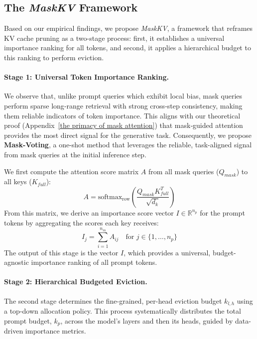 \subsection{The \emph{MaskKV} Framework}
\label{sec: method}
Based on our empirical findings, we propose \emph{MaskKV}, a framework that reframes KV cache pruning as a two-stage process: first, it establishes a universal importance ranking for all tokens, and second, it applies a hierarchical budget to this ranking to perform eviction.

\paragraph{Stage 1: Universal Token Importance Ranking.}

We observe that, unlike prompt queries which exhibit local bias, mask queries perform sparse long‑range retrieval with strong cross‑step consistency, making them reliable indicators of token importance. This aligns with our theoretical proof (Appendix~\ref{the primacy of mask attention}) that mask‑guided attention provides the most direct signal for the generative task.
Consequently, we propose \textbf{Mask-Voting}, a one-shot method that leverages the reliable, task-aligned signal from mask queries at the initial inference step.

We first compute the attention score matrix $A$ from all mask queries ($Q_{mask}$) to all keys ($K_{full}$):
\begin{equation}
    A = \text{softmax}_{\text{row}}\left(\frac{Q_{mask} K_{full}^T}{\sqrt{d_k}}\right)
\end{equation}
From this matrix, we derive an importance score vector $I \in \mathbb{R}^{n_p}$ for the prompt tokens by aggregating the scores each key receives:
\begin{equation}
    I_j = \sum_{i=1}^{n_m} A_{ij} \quad \text{for } j \in \{1, \dots, n_p\}
\end{equation}
The output of this stage is the vector $I$, which provides a universal, budget-agnostic importance ranking of all prompt tokens.

\paragraph{Stage 2: Hierarchical Budgeted Eviction.}
The second stage determines the fine-grained, per-head eviction budget $k_{l,h}$ using a top-down allocation policy. This process systematically distributes the total prompt budget, $k_p$, across the model's layers and then its heads, guided by data-driven importance metrics.

